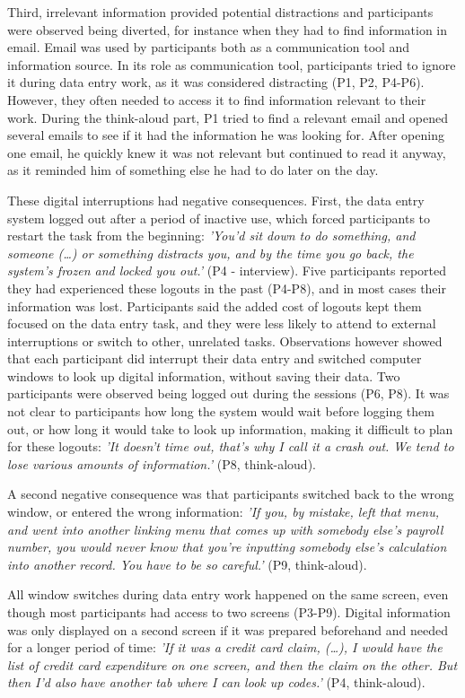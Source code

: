 Third, irrelevant information provided potential distractions and participants were observed being diverted, for instance when they had to find information in email. Email was used by participants both as a communication tool and information source. In its role as communication tool, participants tried to ignore it during data entry work, as it was considered distracting (P1, P2, P4-P6). However, they often needed to access it to find information relevant to their work. During the think-aloud part, P1 tried to find a relevant email and opened several emails to see if it had the information he was looking for. After opening one email, he quickly knew it was not relevant but continued to read it anyway, as it reminded him of something else he had to do later on the day.

These digital interruptions had negative consequences. First, the data entry system logged out after a period of inactive use, which forced participants to restart the task from the beginning: \textit{'You’d sit down to do something, and someone (…) or something distracts you, and by the time you go back, the system’s frozen and locked you out.'} (P4 - interview). Five participants reported they had experienced these logouts in the past (P4-P8), and in most cases their information was lost. Participants said the added cost of logouts kept them focused on the data entry task, and they were less likely to attend to external interruptions or switch to other, unrelated tasks. Observations however showed that each participant did interrupt their data entry and switched computer windows to look up digital information, without saving their data. Two participants were observed being logged out during the sessions (P6, P8). It was not clear to participants how long the system would wait before logging them out, or how long it would take to look up information, making it difficult to plan for these logouts: \textit{'It doesn’t time out, that’s why I call it a crash out. We tend to lose various amounts of information.'} (P8, think-aloud). 

A second negative consequence was that participants switched back to the wrong window, or entered the wrong information: \textit{'If you, by mistake, left that menu, and went into another linking menu that comes up with somebody else’s payroll number, you would never know that you’re inputting somebody else’s calculation into another record. You have to be so careful.'} (P9, think-aloud).

All window switches during data entry work happened on the same screen, even though most participants had access to two screens (P3-P9). Digital information was only displayed on a second screen if it was prepared beforehand and needed for a longer period of time: \textit{'If it was a credit card claim, (…), I would have the list of credit card expenditure on one screen, and then the claim on the other. But then I’d also have another tab where I can look up codes.'} (P4, think-aloud).

